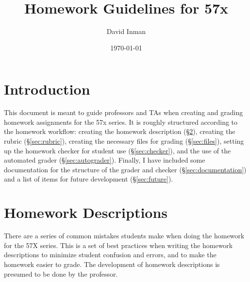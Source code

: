 \documentclass[12pt]{article}
\begin{document}
\title{Homework Guidelines for 57x}
\author{David Inman}
\date{\today}
\maketitle

\tableofcontents{}

\section{Introduction}
This document is meant to guide professors and TAs when creating and grading homework assignments for the 57x series. It is roughly structured according to the homework workflow: creating the homework description (\S\ref{sec:homework}), creating the rubric (\S\ref{sec:rubric}), creating the necessary files for grading (\S\ref{sec:files}), setting up the homework checker for student use (\S\ref{sec:checker}), and the use of the automated grader (\S\ref{sec:autograder}). Finally, I have included some documentation for the structure of the grader and checker (\S\ref{sec:documentation}) and a list of items for future development (\S\ref{sec:future}).


\section{Homework Descriptions} \label{sec:homework}
There are a series of common mistakes students make when doing the homework for the 57X series. This is a set of best practices when writing the homework descriptions to minimize student confusion and errors, and to make the homework easier to grade. The development of homework descriptions is presumed to be done by the professor.
\end{document}
